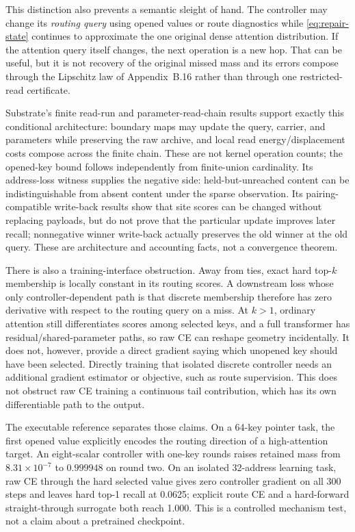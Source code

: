 \documentclass[11pt]{article}
\numberwithin{equation}{section}
\begin{document}
This distinction also prevents a semantic sleight of hand. The controller may change its \emph{routing query}
using opened values or route diagnostics while \eqref{eq:repair-state} continues to approximate the one
original dense attention distribution. If the attention query itself changes, the next operation is a new
hop. That can be useful, but it is not recovery of the original missed mass and its errors compose through the
Lipschitz law of Appendix~B.16 rather than through one restricted-read certificate.

Substrate's finite read-run and parameter-read-chain results support exactly this conditional architecture:
boundary maps may update the query, carrier, and parameters while preserving the raw archive, and local read
energy/displacement costs compose across the finite chain. These are not kernel operation counts;
the opened-key bound follows independently from finite-union cardinality. Its address-loss witness supplies
the negative side: held-but-unreached
content can be indistinguishable from absent content under the sparse observation. Its pairing-compatible
write-back results show that site scores can be changed without replacing payloads, but do not prove that the
particular update improves later recall; nonnegative winner write-back actually preserves the old winner at
the old query. These are architecture and accounting facts, not a convergence theorem.

There is also a training-interface obstruction. Away from ties, exact hard top-$k$ membership is locally
constant in its routing scores. A downstream loss whose only controller-dependent path is that discrete
membership therefore has zero derivative with respect to the routing query on a miss. At $k>1$, ordinary
attention still differentiates scores among selected keys, and a full transformer has residual/shared-parameter
paths, so raw CE can reshape geometry incidentally. It does not, however, provide a direct gradient saying
which unopened key should have been selected. Directly training that isolated discrete controller needs an
additional gradient estimator or objective, such as route supervision. This does not obstruct raw CE training
a continuous tail contribution, which has its own differentiable path to the output.

The executable reference separates those claims. On a 64-key pointer task, the first opened value explicitly
encodes the routing direction of a high-attention target. An eight-scalar controller with one-key rounds raises
retained mass from $8.31\times10^{-7}$ to $0.999948$ on round two. On an isolated 32-address learning task,
raw CE through the hard selected value gives zero controller gradient on all 300 steps and leaves hard top-1
recall at 0.0625; explicit route CE and a hard-forward straight-through surrogate both reach 1.000. This is a
controlled mechanism test, not a claim about a pretrained checkpoint.
\end{document}
